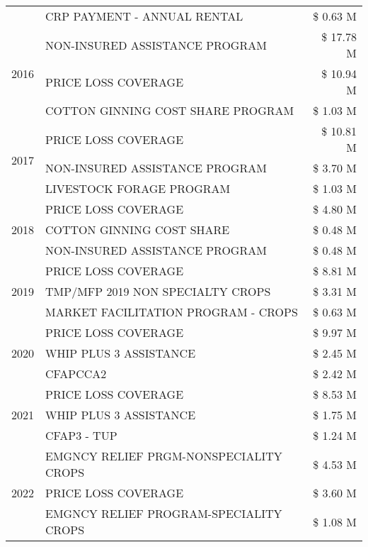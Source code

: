\begin{tabular}{llr}
 & CRP PAYMENT - ANNUAL RENTAL & \$ 0.63 M \\
\cline{1-3}
\multirow[t]{3}{*}{2016} & NON-INSURED ASSISTANCE PROGRAM & \$ 17.78 M \\
 & PRICE LOSS COVERAGE & \$ 10.94 M \\
 & COTTON GINNING COST SHARE PROGRAM & \$ 1.03 M \\
\cline{1-3}
\multirow[t]{3}{*}{2017} & PRICE LOSS COVERAGE & \$ 10.81 M \\
 & NON-INSURED ASSISTANCE PROGRAM & \$ 3.70 M \\
 & LIVESTOCK FORAGE PROGRAM & \$ 1.03 M \\
\cline{1-3}
\multirow[t]{3}{*}{2018} & PRICE LOSS COVERAGE & \$ 4.80 M \\
 & COTTON GINNING COST SHARE & \$ 0.48 M \\
 & NON-INSURED ASSISTANCE PROGRAM & \$ 0.48 M \\
\cline{1-3}
\multirow[t]{3}{*}{2019} & PRICE LOSS COVERAGE & \$ 8.81 M \\
 & TMP/MFP 2019 NON SPECIALTY CROPS & \$ 3.31 M \\
 & MARKET FACILITATION PROGRAM - CROPS & \$ 0.63 M \\
\cline{1-3}
\multirow[t]{3}{*}{2020} & PRICE LOSS COVERAGE & \$ 9.97 M \\
 & WHIP PLUS 3 ASSISTANCE & \$ 2.45 M \\
 & CFAPCCA2 & \$ 2.42 M \\
\cline{1-3}
\multirow[t]{3}{*}{2021} & PRICE LOSS COVERAGE & \$ 8.53 M \\
 & WHIP PLUS 3 ASSISTANCE & \$ 1.75 M \\
 & CFAP3 - TUP & \$ 1.24 M \\
\cline{1-3}
\multirow[t]{3}{*}{2022} & EMGNCY RELIEF PRGM-NONSPECIALITY CROPS & \$ 4.53 M \\
 & PRICE LOSS COVERAGE & \$ 3.60 M \\
 & EMGNCY RELIEF PROGRAM-SPECIALITY CROPS & \$ 1.08 M \\
\cline{1-3}
\bottomrule
\end{tabular}
